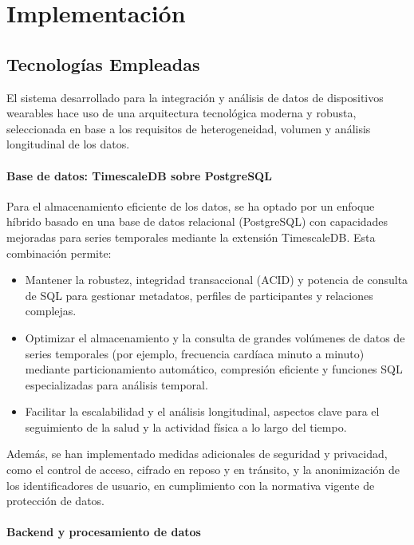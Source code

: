 \section{Implementación}

\subsection{Tecnologías Empleadas}

El sistema desarrollado para la integración y análisis de datos de dispositivos wearables hace uso de una arquitectura tecnológica moderna y robusta, seleccionada en base a los requisitos de heterogeneidad, volumen y análisis longitudinal de los datos.

\paragraph{Base de datos: TimescaleDB sobre PostgreSQL}

Para el almacenamiento eficiente de los datos, se ha optado por un enfoque híbrido basado en una base de datos relacional (PostgreSQL) con capacidades mejoradas para series temporales mediante la extensión TimescaleDB. Esta combinación permite:
\begin{itemize}
    \item Mantener la robustez, integridad transaccional (ACID) y potencia de consulta de SQL para gestionar metadatos, perfiles de participantes y relaciones complejas.
    \item Optimizar el almacenamiento y la consulta de grandes volúmenes de datos de series temporales (por ejemplo, frecuencia cardíaca minuto a minuto) mediante particionamiento automático, compresión eficiente y funciones SQL especializadas para análisis temporal.
    \item Facilitar la escalabilidad y el análisis longitudinal, aspectos clave para el seguimiento de la salud y la actividad física a lo largo del tiempo.
\end{itemize}

Además, se han implementado medidas adicionales de seguridad y privacidad, como el control de acceso, cifrado en reposo y en tránsito, y la anonimización de los identificadores de usuario, en cumplimiento con la normativa vigente de protección de datos.

\paragraph{Backend y procesamiento de datos}

